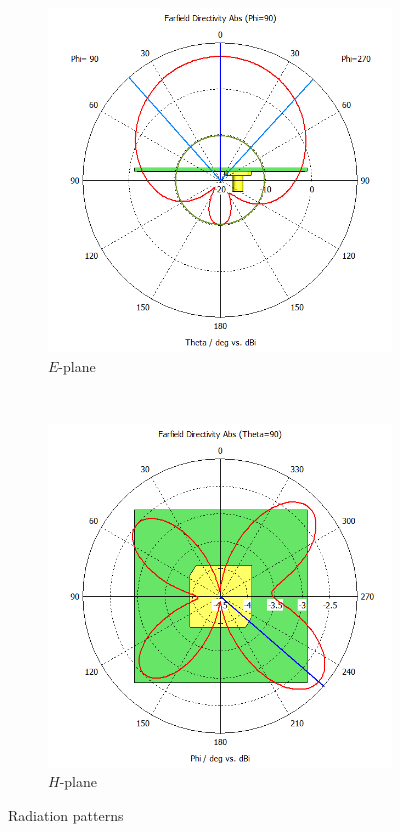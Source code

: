 \documentclass[11pt,a4paper]{article}
\begin{document}
        \begin{figure}[!ht]
            \centering
            \begin{subfigure}{.4\textwidth}
                \centering
                \includegraphics[width=\textwidth]{src/radiation-e.png}
                \caption{\label{fig:radiation-e}$E$-plane}
            \end{subfigure}
            ~
            \begin{subfigure}{.4\textwidth}
                \centering
                \includegraphics[width=\textwidth]{src/radiation-h.png}
                \caption{\label{fig:radiation-h}$H$-plane}
            \end{subfigure}
            \caption{\label{fig:radiation-patterns}Radiation patterns}
        \end{figure}
        
\end{document}
